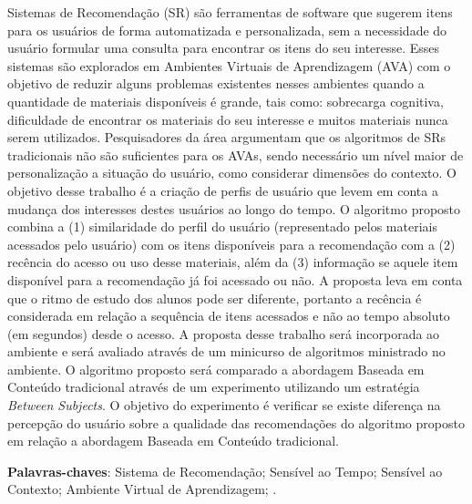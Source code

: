 \begin{resumo}
  Sistemas de Recomendação (SR) são ferramentas de software que sugerem itens para os usuários de forma automatizada e personalizada,
  sem a necessidade do usuário formular uma consulta para encontrar os itens do seu interesse. Esses sistemas são
  explorados em Ambientes Virtuais de Aprendizagem (AVA) com o objetivo de reduzir alguns problemas existentes nesses ambientes
  quando a quantidade de materiais disponíveis é grande, tais como: sobrecarga cognitiva, dificuldade de encontrar os materiais
  do seu interesse e muitos materiais nunca serem utilizados. Pesquisadores da área argumentam que os algoritmos de SRs tradicionais não são suficientes para os AVAs,
  sendo necessário um nível maior de personalização a situação do usuário, como considerar dimensões do contexto. O objetivo
  desse trabalho é a criação de perfis de usuário que levem em conta a mudança dos interesses destes usuários
  ao longo do tempo. O algoritmo proposto combina a (1) similaridade do perfil do usuário (representado
  pelos materiais acessados pelo usuário) com os itens disponíveis para a recomendação com a (2) recência do acesso ou uso
  desse materiais, além da (3) informação se aquele item disponível para a recomendação já foi acessado ou não. A
  proposta leva em conta que o ritmo de estudo dos alunos pode ser diferente, portanto a recência é considerada em relação
  a sequência de itens acessados e não ao tempo absoluto (em segundos) desde o acesso. A proposta desse trabalho será
  incorporada ao ambiente \adaptweb e será avaliado através de um minicurso de algoritmos ministrado no ambiente.
  O algoritmo proposto será comparado a abordagem Baseada em Conteúdo tradicional através de um experimento utilizando um
  estratégia \textit{Between Subjects}. O objetivo do experimento é verificar se existe diferença na percepção do usuário
  sobre a qualidade das recomendações do algoritmo proposto em relação a abordagem Baseada em Conteúdo tradicional.

  \vspace{\onelineskip}

  \noindent
  \textbf{Palavras-chaves}: Sistema de Recomendação; Sensível ao Tempo; Sensível ao Contexto; Ambiente Virtual de Aprendizagem; \adaptweb.
\end{resumo}

